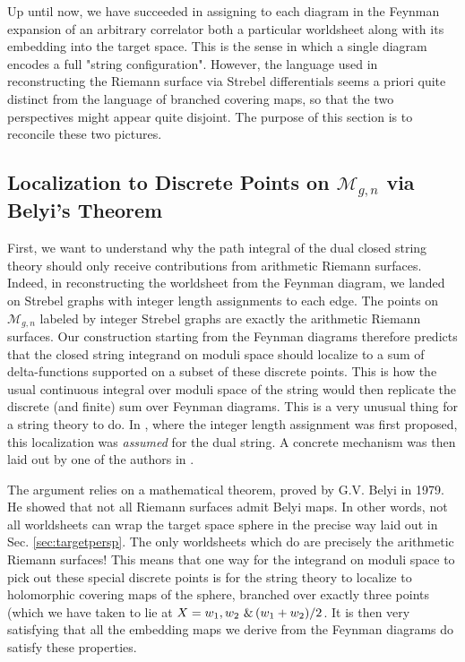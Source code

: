 \documentclass[english]{article}
\renewcommand{\>}{\rangle}
\newcommand{\<}{\langle}
\renewcommand{\(}{\left(}
\renewcommand{\)}{\right)}
\begin{document}
Up until now, we have succeeded in assigning to each diagram in the Feynman expansion of an arbitrary correlator both a particular worldsheet along with its embedding into the target space. This is the sense in which a single diagram encodes a full "string configuration". However, the language used in reconstructing the Riemann surface via Strebel differentials seems a priori quite distinct from the language of branched covering maps, so that the two perspectives might appear quite disjoint. The purpose of this section is to reconcile these two pictures.

\subsection{Localization to Discrete Points on $\mathcal{M}_{g,n}$ via Belyi's Theorem} \label{sec:StringLocalization}
First, we want to understand why the path integral of the dual closed string theory should only receive contributions from arithmetic Riemann surfaces. Indeed, in reconstructing the worldsheet from the Feynman diagram, we landed on Strebel graphs with integer length assignments to each edge. The points on $\mathcal{M}_{g,n}$ labeled by integer Strebel graphs are exactly the arithmetic Riemann surfaces. Our construction starting from the Feynman diagrams therefore predicts that the closed string integrand on moduli space should localize to a sum of delta-functions supported on a subset of these discrete points. This is how the usual continuous integral over moduli space of the string would then replicate the discrete (and finite) sum over Feynman diagrams. This is a very unusual thing for a string theory to do. In \cite{razamat2010matrices,razamatGauss}, where the integer length assignment was first proposed, this localization was \textit{assumed} for the dual string. A concrete mechanism was then laid out by one of the authors in \cite{gopakumar2011simplest}.

The argument relies on a mathematical theorem, proved by G.V. Belyi in 1979\cite{zbMATH03668723}. He showed that not all Riemann surfaces admit Belyi maps. In other words, not all worldsheets can wrap the target space sphere in the precise way laid out in Sec. \ref{sec:targetpersp}. The only worldsheets which do are precisely the arithmetic Riemann surfaces! This means that one way for the integrand on moduli space to pick out these special discrete points is for the string theory to localize to holomorphic covering maps of the sphere, branched over exactly three points (which we have taken to lie at $X=w_1,w_2 \  \& \thinspace (w_1+w_2)/2$. It is then very satisfying that all the embedding maps we derive from the Feynman diagrams do satisfy these properties. 
\end{document}
